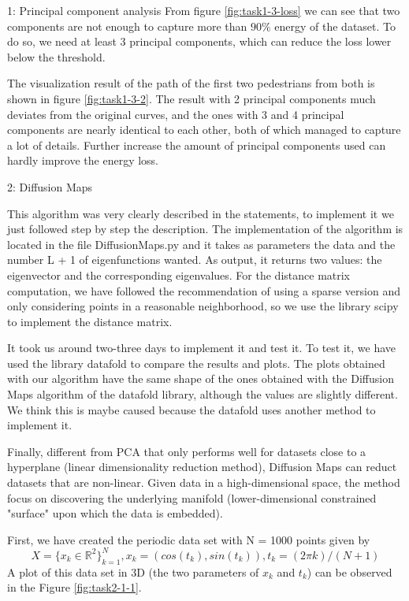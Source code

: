 \documentclass[10pt,a4paper]{article}
\begin{document}
\begin{task}{1: Principal component analysis}
From figure \ref{fig:task1-3-loss} we can see that two components are not enough to capture more than $90\%$ energy of the dataset. To do so, we need at least 3 principal components, which can reduce the loss lower below the threshold. 

The visualization result of the path of the first two pedestrians from both is shown in figure \ref{fig:task1-3-2}. The result with 2 principal components much deviates from the original curves, and the ones with 3 and 4 principal components are nearly identical to each other, both of which managed to capture a lot of details. Further increase the amount of principal components used can hardly improve the energy loss.
\bigskip
\end{task}

\newpage
\begin{task}{2: Diffusion Maps}

This algorithm was very clearly described in the statements, to implement it we just followed step by step the description. The implementation of the algorithm is located in the file DiffusionMaps.py and it takes as parameters the data and the number L + 1 of eigenfunctions wanted. As output, it returns two values: the eigenvector and the corresponding eigenvalues. For the distance matrix computation, we have followed the recommendation of using a sparse version and only considering points in a reasonable neighborhood, so we use the library scipy to implement the distance matrix.

It took us around two-three days to implement it and test it. To test it, we have used the library datafold to compare the results and plots. The plots obtained with our algorithm have the same shape of the ones obtained with the Diffusion Maps algorithm of the datafold library, although the values are slightly different. We think this is maybe caused because the datafold uses another method to implement it. 

Finally, different from PCA that only performs well for datasets close to a hyperplane (linear dimensionality reduction method), Diffusion Maps can reduct datasets that are non-linear. Given data in a high-dimensional space, the method focus on discovering the underlying manifold (lower-dimensional constrained "surface" upon which the data is embedded). 
\bigskip


First, we have created the periodic data set with N = 1000 points given by 
\[
X = \{ x_k \in \mathbb R^2 \}_{k=1}^{N}, x_k = (cos(t_k),sin(t_k)), t_k = (2{\pi}k)/(N + 1)
\]
A plot of this data set in 3D (the two parameters of \(x_k\) and \(t_k\)) can be observed in the Figure \ref{fig:task2-1-1}. 


\end{task}
\end{document}
